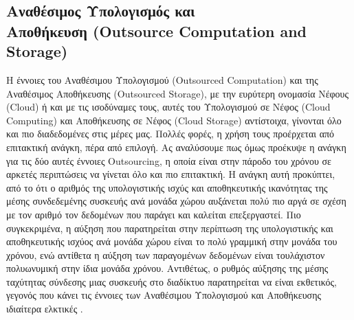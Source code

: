 \subsection[Αναθέσιμος Υπολογισμός και Αποθήκευση (Outsource Computation and Storage)]{Αναθέσιμος Υπολογισμός και \\ Αποθήκευση (Outsource Computation and Storage)}
Η έννοιες του Αναθέσιμου Υπολογισμού (Outsourced Computation) και της Αναθέσιμος Αποθήκευσης (Outsourced Storage), με την ευρύτερη ονομασία Νέφους (Cloud) ή και με τις ισοδύναμες τους, αυτές του Υπολογισμού σε Νέφος (Cloud Computing) και Αποθήκευσης σε Νέφος (Cloud Storage) αντίστοιχα, γίνονται όλο και πιο διαδεδομένες στις μέρες μας. Πολλές φορές, η χρήση τους προέρχεται από επιτακτική ανάγκη, πέρα από επιλογή. Ας αναλύσουμε πως όμως προέκυψε η ανάγκη για τις δύο αυτές έννοιες Outsourcing, η οποία είναι στην πάροδο του χρόνου σε αρκετές περιπτώσεις να γίνεται όλο και πιο επιτακτική. Η ανάγκη αυτή προκύπτει, από το ότι ο αριθμός της υπολογιστικής ισχύς και αποθηκευτικής ικανότητας της μέσης συνδεδεμένης συσκευής ανά μονάδα χώρου αυξάνεται πολύ πιο αργά σε σχέση με τον αριθμό τον δεδομένων που παράγει και καλείται επεξεργαστεί. Πιο συγκεκριμένα, η αύξηση που παρατηρείται στην περίπτωση της υπολογιστικής και αποθηκευτικής ισχύος ανά μονάδα χώρου είναι το πολύ γραμμική στην μονάδα του χρόνου, ενώ αντίθετα η αύξηση των παραγομένων δεδομένων είναι τουλάχιστον πολυωνυμική στην ίδια μονάδα χρόνου. Αντιθέτως, ο ρυθμός αύξησης της μέσης ταχύτητας σύνδεσης μιας συσκευής στο διαδίκτυο παρατηρείται να είναι εκθετικός, γεγονός που κάνει τις έννοιες των Αναθέσιμου Υπολογισμού και Αποθήκευσης ιδιαίτερα ελκτικές \cite{aljabre2012cloud} \cite{golightly2022adoption} \cite{chen2016perceived}.

